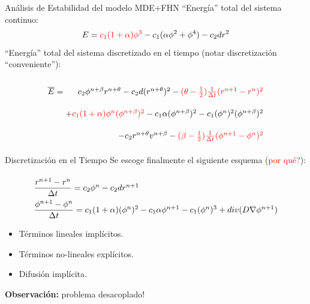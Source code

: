 \documentclass[11pt,spanish]{beamer}
\newcommand{\red}{\textcolor{red}}
\begin{document}
\begin{frame}{Análisis de Estabilidad del modelo MDE+FHN}
``Energía'' total del sistema continuo:
\begin{equation*}
E = \red{c_1 (1 + \alpha) \phi^3} - c_1 (\alpha \phi^2 +  \phi^4) -c_2 d r^2 \label{eq:total_energy}
\end{equation*}
\pause
``Energía'' total del sistema discretizado en el tiempo (notar discretización ``conveniente''): 

\begin{equation*}
\arraycolsep=1.4pt\def\arraystretch{2.2}
\begin{array}{lr}
\overline{E} = & c_2 \phi^{n + \beta} r^{n + \theta} - c_2 d (r^{n + \theta})^2 
 - \red{(\theta - \frac{1}{2}) \frac{1}{\Delta t} (r^{n+1} - r^n)^2}  \\
& + \red{ c_1 (1 + \alpha) \phi^n (\phi^{n + \beta})^2} - c_1 \alpha (\phi^{n + \beta})^{2}
- c_1 (\phi^n)^2 (\phi^{n + \beta})^2 \\
& - c_2 r^{n + \theta} v^{n + \beta}
- \red{(\beta - \frac{1}{2}) \frac{1}{\Delta t} (\phi^{n+1} - \phi^n)^2 }
\end{array}
\end{equation*}
\end{frame}

\begin{frame}{Discretización en el Tiempo}
Se escoge finalmente el siguiente esquema (\red{por qué?}):

\begin{equation*}
\arraycolsep=1.4pt\def\arraystretch{2.2}
\begin{array}{llr}
\dfrac{r^{n+1} - r^n}{\Delta t} = c_2 \phi^n - c_2 d r^{n+1} \\
\dfrac{\phi^{n+1} - \phi^n}{\Delta t} = c_1 (1 + \alpha) (\phi^n)^2 - c_1 \alpha \phi^{n+1} - c_1 (\phi^n)^3 + div(D \nabla \phi^{n+1})
\end{array}
\end{equation*}

\begin{itemize}
\pause
\item Términos lineales implícitos.\pause
\item Términos no-lineales explícitos.  \pause
\item Difusión implícita. \pause
\end{itemize}
\textbf{Observación:} problema desacoplado!
\end{frame}
\end{document}
